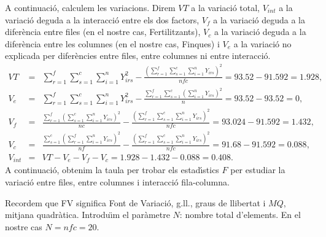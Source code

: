 {A continuaci\'o, calculem les variacions. Direm $VT$ a la 
variaci\'o total, $V_{int}$ a la variaci\'o  deguda a la interacci\'o entre 
els dos factors, $V_f$ a la variaci\'o deguda a la difer\`encia entre 
files (en el nostre cas, Fertilitzants), $V_c$ a la variaci\'o deguda a 
la difer\`encia entre les columnes (en el nostre cas, Finques) i $V_e$ a 
la variaci\'o no explicada per difer\`encies entre files, entre columnes 
ni entre interacci\'o.
\begin{eqnarray*}
	VT & = & \sum_{r=1}^f\sum_{s=1}^c\sum_{i=1}^n Y_{irs}^2 -
	\frac{{\left(\sum\limits_{r=1}^f\sum\limits_{s=1}^c\sum\limits_{i=1}^n 
	Y_{irs}\right)}^2}{nfc} = 93.52 - 91.592 =1.928, \\
	V_e & = & \sum_{r=1}^f\sum_{s=1}^c\sum_{i=1}^n Y_{irs}^2 -
	 \frac{\sum\limits_{r=1}^f\sum\limits_{s=1}^c{\left(\sum\limits_{i=1}^n 
	Y_{irs}\right)}^2}{n} = 93.52 - 93.52 =0, \\
	V_f & = & \frac{\sum\limits_{r=1}^f {\left(\sum\limits_{s=1}^c \sum\limits_{i=1}^n 
	Y_{irs}\right)}^2}{nc} -\frac{{\left(\sum\limits_{r=1}^f\sum\limits_{s=1}^c\sum\limits_{i=1}^n 
	Y_{irs}\right)}^2}{nfc} = 93.024 - 91.592 =1.432,
	 \\
	V_c & = & \frac{\sum\limits_{s=1}^c {\left(\sum\limits_{r=1}^f \sum\limits_{i=1}^n 
	Y_{irs}\right)}^2}{nf}- \frac{{\left(\sum\limits_{r=1}^f\sum\limits_{s=1}^c\sum\limits_{i=1}^n 
	Y_{irs}\right)}^2}{nfc} = 91.68 - 91.592 = 0.088,\\
	V_{int} & = & VT- V_e - V_f - V_c = 1.928 - 1.432 - 0.088 = 0.408.
\end{eqnarray*}
A continuaci\'o, obtenim la taula per trobar els estad\'{\i}stics $F$ per 
estudiar la variaci\'o entre files, entre columnes i interacci\'o 
fila-columna. 

Recordem que FV significa Font de Variaci\'o, g.ll., graus de 
llibertat i $MQ$, mitjana quadr\`atica. Introdu\"{\i}m el par\`ametre $N$:
nombre total d'elements. En el nostre cas $N=nfc=20$.

}
